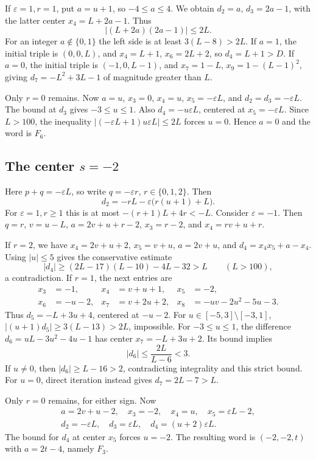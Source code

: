 If $\varepsilon=1,r=1$, put $a=u+1$, so $-4\le a\le4$.
We obtain $d_2=a$, $d_3=2a-1$, with the latter center
$x_4=L+2a-1$. Thus
\[
 |(L+2a)(2a-1)|\le2L.
\]
For an integer $a\notin\{0,1\}$ the left side is at least
$3(L-8)>2L$. If $a=1$, the initial triple is $(0,0,L)$,
and $x_4=L+1$, $x_6=2L+2$, so $d_4=L+1>D$.
If $a=0$, the initial triple is $(-1,0,L-1)$, and
$x_7=1-L$, $x_9=1-(L-1)^2$, giving
$d_7=-L^2+3L-1$ of magnitude greater than $L$.

Only $r=0$ remains. Now $a=u$, $x_3=0$, $x_4=u$,
$x_5=-\varepsilon L$, and $d_2=d_3=-\varepsilon L$.
The bound at $d_3$ gives $-3\le u\le1$.
Also $d_4=-u\varepsilon L$, centered at
$x_5=-\varepsilon L$. Since $L>100$, the inequality
$|(-\varepsilon L+1)u\varepsilon L|\le2L$
forces $u=0$. Hence $a=0$ and the word is $F_6$.

\subsection{The center \texorpdfstring{$s=-2$}{s=-2}}
Here $p+q=-\varepsilon L$, so write
$q=-\varepsilon r$, $r\in\{0,1,2\}$. Then
\[
 d_2=-rL-\varepsilon\bigl(r(u+1)+L\bigr).
\]
For $\varepsilon=1,r\ge1$ this is at most
$-(r+1)L+4r<-L$. Consider $\varepsilon=-1$.
Then $q=r$, $v=u-L$, $a=2v+u+r-2$,
$x_3=r-2$, and $x_4=rv+u+r$.

If $r=2$, we have $x_4=2v+u+2$, $x_5=v+u$,
$a=2v+u$, and $d_4=x_4x_5+a-x_4$.
Using $|u|\le5$ gives the conservative estimate
\[
 |d_4|\ge(2L-17)(L-10)-4L-32>L
 \qquad(L>100),
\]
a contradiction. If $r=1$, the next entries are
\begin{align*}
 x_3&=-1,&x_4&=v+u+1,&x_5&=-2,\\
 x_6&=-u-2,&x_7&=v+2u+2,&
 x_8&=-uv-2u^2-5u-3.
\end{align*}
Thus $d_5=-L+3u+4$, centered at $-u-2$.
For $u\in[-5,3]\setminus[-3,1]$,
$|(u+1)d_5|\ge3(L-13)>2L$, impossible.
For $-3\le u\le1$, the difference
$d_6=uL-3u^2-4u-1$ has center
$x_7=-L+3u+2$. Its bound implies
\[
 |d_6|\le\frac{2L}{L-6}<3.
\]
If $u\ne0$, then $|d_6|\ge L-16>2$, contradicting
integrality and this strict bound. For $u=0$, direct
iteration instead gives $d_7=2L-7>L$.

Only $r=0$ remains, for either sign. Now
\begin{gather*}
 a=2v+u-2,\quad x_3=-2,\quad x_4=u,\quad
 x_5=\varepsilon L-2,\\
 d_2=-\varepsilon L,\quad d_3=\varepsilon L,
 \quad d_4=(u+2)\varepsilon L.
\end{gather*}
The bound for $d_4$ at center $x_5$ forces $u=-2$.
The resulting word is $(-2,-2,t)$ with $a=2t-4$, namely
$F_3$.

